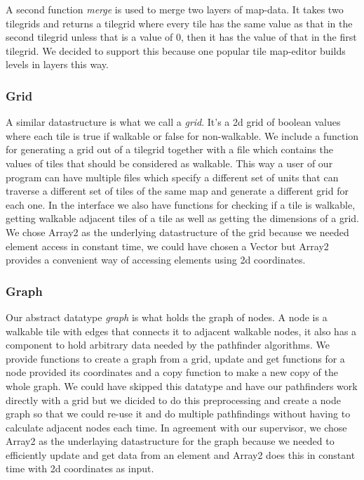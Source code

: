\documentclass[12pt, a4paper]{article}
\begin{document}
A second function \textit{merge} is used to merge two layers of map-data. It takes two tilegrids and returns a tilegrid where every tile has the same value as that in the second tilegrid unless that is a value of 0, then it has the value of that in the first tilegrid. We decided to support this because one popular tile map-editor\cite{mapeditor} builds levels in layers this way.

\subsubsection{Grid}

A similar datastructure is what we call a \textit{grid}. It's a 2d grid of boolean values where each tile is true if walkable or false for non-walkable. We include a function for generating a grid out of a tilegrid together with a file which contains the values of tiles that should be considered as walkable. This way a user of our program can have multiple files which specify a different set of units that can traverse a different set of tiles of the same map and generate a different grid for each one. In the interface we also have functions for checking if a tile is walkable, getting walkable adjacent tiles of a tile as well as getting the dimensions of a grid. We chose Array2 as the underlying datastructure of the grid because we needed element access in constant time, we could have chosen a Vector but Array2 provides a convenient way of accessing elements using 2d coordinates.

\subsubsection{Graph}
Our abstract datatype \textit{graph} is what holds the graph of nodes. A node is a walkable tile with edges that connects it to adjacent walkable nodes, it also has a component to hold arbitrary data needed by the pathfinder algorithms. We provide functions to create a graph from a grid, update and get functions for a node provided its coordinates and a copy function to make a new copy of the whole graph. We could have skipped this datatype and have our pathfinders work directly with a grid but we dicided to do this preprocessing and create a node graph so that we could re-use it and do multiple pathfindings without having to calculate adjacent nodes each time. In agreement with our supervisor, we chose Array2 as the underlaying datastructure for the graph because we needed to efficiently update and get data from an element and Array2 does this in constant time with 2d coordinates as input.
\end{document}
